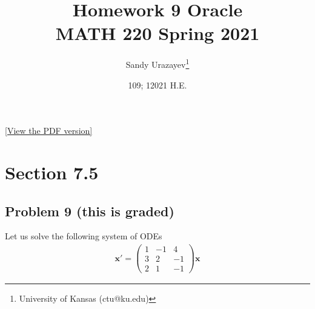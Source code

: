 \documentclass[12pt]{article}
\author{Sandy Urazayev\thanks{University of Kansas (ctu@ku.edu)}}
\date{109; 12021 H.E.}
\title{Homework 9 Oracle\\\medskip
\large MATH 220 Spring 2021}
\begin{document}
\maketitle
\href{./index.pdf}{[View the PDF version]​}

\section*{Section 7.5}
\label{sec:org38917ce}
\subsection*{Problem 9 (this is graded)}
\label{sec:org3e35be9}
Let us solve the following system of ODEs
\begin{align*}
        \mathbf{x}' =
        \begin{pmatrix}
                1 & -1 & 4  \\
                3 & 2  & -1 \\
                2 & 1  & -1
        \end{pmatrix} \mathbf{x}
\end{align*}
\end{document}
